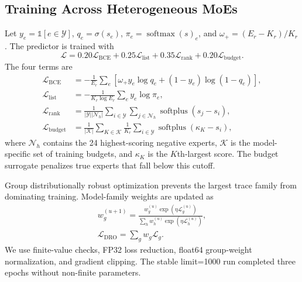 \documentclass[conference]{IEEEtran}
\begin{document}
\subsection{Training Across Heterogeneous MoEs}
Let $y_e=\mathbb{1}[e\in\mathcal{Y}]$, $q_e=\sigma(s_e)$, $\pi_e=\operatorname{softmax}(s)_e$, and $\omega_+=(E_r-K_r)/K_r$. The predictor is trained with
\begin{equation}
\mathcal{L}=0.20\mathcal{L}_{\mathrm{BCE}}
+0.25\mathcal{L}_{\mathrm{list}}
+0.35\mathcal{L}_{\mathrm{rank}}
+0.20\mathcal{L}_{\mathrm{budget}}.
\label{eq:total-loss}
\end{equation}
The four terms are
\begin{align}
\mathcal{L}_{\mathrm{BCE}}
&=-\frac{1}{E_r}\sum_e\left[\omega_+y_e\log q_e+(1-y_e)\log(1-q_e)\right],\\
\mathcal{L}_{\mathrm{list}}
&=-\frac{1}{K_r\log E_r}\sum_e y_e\log\pi_e,\\
\mathcal{L}_{\mathrm{rank}}
&=\frac{1}{|\mathcal{Y}||\mathcal{N}_h|}
\sum_{i\in\mathcal{Y}}\sum_{j\in\mathcal{N}_h}
\operatorname{softplus}(s_j-s_i),\\
\mathcal{L}_{\mathrm{budget}}
&=\frac{1}{|\mathcal{K}|}\sum_{K\in\mathcal{K}}
\frac{1}{K_r}\sum_{i\in\mathcal{Y}}
\operatorname{softplus}(\kappa_K-s_i),
\label{eq:loss-components}
\end{align}
where $\mathcal{N}_h$ contains the 24 highest-scoring negative experts, $\mathcal{K}$ is the model-specific set of training budgets, and $\kappa_K$ is the $K$th-largest score. The budget surrogate penalizes true experts that fall below this cutoff.

Group distributionally robust optimization prevents the largest trace family from dominating training. Model-family weights are updated as
\begin{align}
w_g^{(u+1)}=
\frac{w_g^{(u)}\exp(\eta\mathcal{L}_g^{(u)})}
{\sum_h w_h^{(u)}\exp(\eta\mathcal{L}_h^{(u)})},\\
\mathcal{L}_{\mathrm{DRO}}=\sum_g w_g\mathcal{L}_g.
\label{eq:group-dro}
\end{align}
We use finite-value checks, FP32 loss reduction, float64 group-weight normalization, and gradient clipping. The stable limit=1000 run completed three epochs without non-finite parameters.
\end{document}
